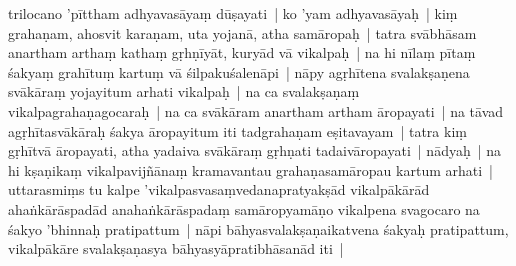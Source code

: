 \documentclass[article,12pt,a4paper]{memoir}%
\newcommand{\persName}[1]{#1}
\newcounter{parCount}
\begin{document}
	  
	  \pstart \leavevmode%
	\label{thakur75-135.5}\persName{trilocano} 'pīttham adhyavasāyaṃ dūṣayati | ko 'yam adhyavasāyaḥ | kiṃ grahaṇam, ahosvit karaṇam, uta yojanā, atha samāropaḥ | tatra svābhāsam anartham arthaṃ kathaṃ gṛhṇīyāt, kuryād vā vikalpaḥ | na hi nīlaṃ pītaṃ śakyaṃ grahītuṃ kartuṃ vā śilpakuśalenāpi | nāpy agṛhītena svalakṣaṇena svākāraṃ yojayitum arhati vikalpaḥ | na ca svalakṣaṇaṃ vikalpagrahaṇagocaraḥ | na ca svākāram anartham artham āropayati | na tāvad agṛhītasvākāraḥ śakya āropayitum iti tadgrahaṇam eṣitavayam | tatra kiṃ gṛhītvā āropayati, atha yadaiva svākāraṃ gṛhṇati tadaivāropayati | nādyaḥ | na hi kṣaṇikaṃ vikalpavijñānaṃ kramavantau grahaṇasamāropau kartum arhati | uttarasmiṃs tu kalpe 'vikalpasvasaṃvedanapratyakṣād vikalpākārād ahaṅkārāspadād \label{ratnakīrtinibandhāvali__36r1PF7IMSHYRSCDBXH9LGA21E4}anahaṅkārāspadaṃ\label{ratnakīrtinibandhāvali__36r1PF7IMSFWSK9HRW3N8HTPE53} samāropyamāṇo vikalpena svagocaro na śakyo 'bhinnaḥ pratipattum | nāpi bāhya\label{ratnakīrtinibandhāvali__36r1PF7IMSDWIZ4SK58R7BCRQH3}svalakṣaṇaikatvena\label{ratnakīrtinibandhāvali__36r1PF7IMSBV2F426HMP90OT53H} śakyaḥ pratipattum, vikalpākāre svalakṣaṇasya bāhyasyāpratibhāsanād iti |
	{}
	\pend%
      
\end{document}
